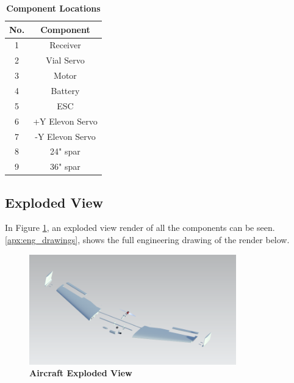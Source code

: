         \begin{table}[H]
        \begin{center}
        \caption{\textbf{Component Locations}} \label{tab:component_locations}
        \begin{tabular}{|c|c|} 
            \hline
            \textbf{No.} & \textbf{Component} \\ \hline
            1 & Receiver \\ \hline
            2 & Vial Servo \\ \hline
            3 & Motor \\ \hline
            4 & Battery \\ \hline
            5 & ESC \\ \hline
            6 & +Y Elevon Servo \\ \hline
            7 & -Y Elevon Servo \\ \hline
            8 & 24" spar \\ \hline
            9 & 36" spar \\ \hline
        \end{tabular}
        \end{center}
        \end{table}
        
    \subsection{Exploded View}
    
        In Figure \ref{fig:exploded}, an exploded view render of all the components can be seen. \ref{apx:eng_drawings}, shows the full engineering drawing of the render below.
        
        \begin{figure}[H]
            \centering
            \includegraphics[width=0.8\textwidth]{homeworks/homework4/report/Figure/aircraft_assembly_exploded.png}
            \caption{\textbf{Aircraft Exploded View}}
            \label{fig:exploded}
        \end{figure}
    
